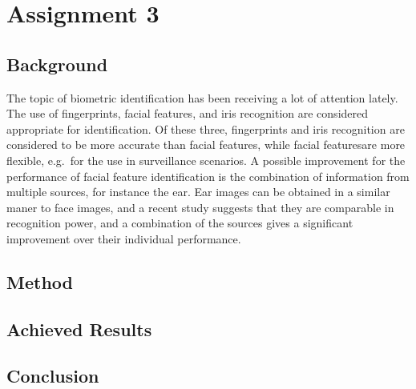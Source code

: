 \documentclass{article}
\begin{document}
\subsection{}
\subsection{}
\subsection{}
\subsection{}

\section{Assignment 3}
\subsection{Background}
The topic of biometric identification has been receiving a lot of attention lately.
The use of fingerprints, facial features, and iris recognition are considered appropriate for identification.
Of these three, fingerprints and iris recognition are considered to be more accurate than facial features,
while facial featuresare more flexible, e.g.\ for the use in surveillance scenarios.
A possible improvement for the performance of facial feature identification is the combination of information from multiple sources,
for instance the ear.
Ear images can be obtained in a similar maner to face images, 
and a recent study suggests that they are comparable in recognition power\cite{chang2003comparison},
and a combination of the sources gives a significant improvement over their individual performance.
\subsection{Method}
\subsection{Achieved Results}
\subsection{Conclusion}



\end{document}
